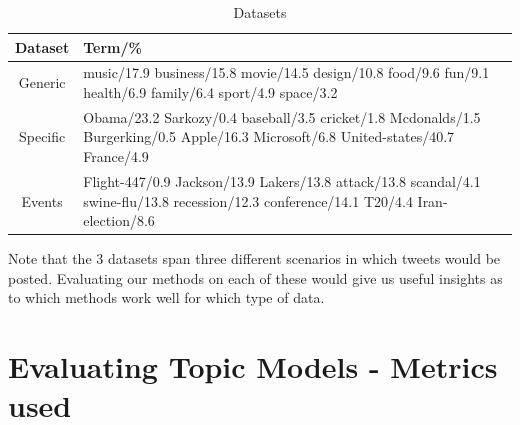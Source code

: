 \documentclass[10pt,a5paper,twoside]{article}
\begin{document}
\begin{table}[!h]
\centering
	\begin{tabular}{|c|p{4in}|}
	\hline
        Dataset & Term/\% \\
\hline
Generic &{\small music/17.9 business/15.8 movie/14.5 design/10.8
       food/9.6 fun/9.1 health/6.9 family/6.4 sport/4.9 space/3.2}  \\
Specific &{\small 
Obama/23.2 Sarkozy/0.4 baseball/3.5 cricket/1.8 Mcdonalds/1.5 Burgerking/0.5 Apple/16.3 Microsoft/6.8 United-states/40.7 France/4.9} \\
Events &{\small Flight-447/0.9 Jackson/13.9  Lakers/13.8 attack/13.8 scandal/4.1 swine-flu/13.8 recession/12.3 conference/14.1 T20/4.4 Iran-election/8.6  }\\
	\hline
	\end{tabular}
\caption{Datasets}\label{tbl-q}
\end{table}
Note that the 3 datasets span three different scenarios in which  tweets would be posted. Evaluating our methods on each of these would give us useful insights as to which methods work well for which type of data. 

\section{Evaluating Topic Models - Metrics used}
\end{document}
